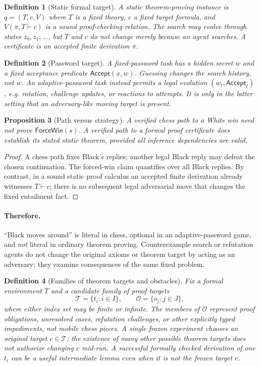 \documentclass[11pt,letterpaper]{article}
\newtheorem{definition}{Definition}[section]
\newtheorem{proposition}[definition]{Proposition}
\begin{document}
\begin{definition}[Static formal target]
A static theorem-proving instance is $q=(T,c,V)$ where $T$ is a fixed theory, $c$ a fixed target formula, and $V(\pi,T\vdash c)$ is a sound proof-checking relation. The search may evolve through states $z_0,z_1,\ldots$, but $T$ and $c$ do not change merely because an agent searches. A certificate is an accepted finite derivation $\pi$.
\end{definition}

\begin{definition}[Password target]
A fixed-password task has a hidden secret $w$ and a fixed acceptance predicate $\mathsf{Accept}(x,w)$. Guessing changes the search history, not $w$. An adaptive-password task instead permits a legal evolution $(w_t,\mathsf{Accept}_t)$, e.g. rotation, challenge updates, or reactions to attempts. It is only in the latter setting that an adversary-like moving target is present.
\end{definition}

\begin{proposition}[Path versus strategy]
A verified chess path to a White win need not prove $\mathsf{ForceWin}(s)$. A verified path to a formal proof certificate \emph{does} establish its stated static theorem, provided all inference dependencies are valid.
\end{proposition}
\begin{proof}
A chess path fixes Black's replies; another legal Black reply may defeat the chosen continuation. The forced-win claim quantifies over all Black replies. By contrast, in a sound static proof calculus an accepted finite derivation already witnesses $T\vdash c$; there is no subsequent legal adversarial move that changes the fixed entailment fact.\end{proof}

\paragraph{Therefore.} ``Black moves around'' is literal in chess, optional in an adaptive-password game, and \emph{not} literal in ordinary theorem proving. Counterexample search or refutation agents do not change the original axioms or theorem target by acting as an adversary; they examine consequences of the same fixed problem.

\begin{definition}[Families of theorem targets and obstacles]
Fix a formal environment $T$ and a candidate family of proof targets
\[
\mathcal T=\{t_i:i\in I\},\qquad \mathcal O=\{o_j:j\in J\},
\]
where either index set may be finite or infinite. The members of $\mathcal O$ represent proof obligations, unresolved cases, refutation challenges, or other explicitly typed impediments, not mobile chess pieces. A single frozen experiment chooses an original target $c\in\mathcal T$; the existence of many other possible theorem targets does not authorize changing $c$ mid-run. A successful formally checked derivation of one $t_i$ can be a useful intermediate lemma even when it is not the frozen target $c$.
\end{definition}
\end{document}
